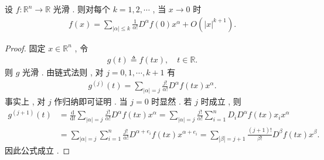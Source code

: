 \documentclass[../../main.tex]{subfiles}
\begin{document}
\begin{theorem}\label{theorem:ch01-taylor}
设 \(f:\mathbb{R}^n\to\mathbb{R}\) 光滑 . 则对每个 \(k=1,2,\cdots\) , 当 \(x\to 0\) 时
\begin{align*}
f(x)=\sum\limits_{|\alpha|\leqslant k}\frac{1}{\alpha!}D^\alpha f(0)x^\alpha+O(|x|^{k+1}).
\end{align*}
\end{theorem}
\begin{proof}
固定 \(x\in\mathbb{R}^n\) , 令
\begin{align*}
g(t)\triangleq f(tx),\quad t\in\mathbb{R}.
\end{align*}
则 \(g\) 光滑 . 由链式法则 , 对 \(j=0,1,\cdots,k+1\) 有
\begin{align*}
g^{(j)}(t)=\sum\limits_{|\alpha|=j}\frac{j!}{\alpha!}D^\alpha f(tx)x^\alpha.
\end{align*}
事实上 , 对 \(j\) 作归纳即可证明 . 当 \(j=0\) 时显然 . 若 \(j\) 时成立 , 则
\begin{align*}
g^{(j+1)}(t)
&=\frac{\mathrm{d}}{\mathrm{d}t}\sum\limits_{|\alpha|=j}\frac{j!}{\alpha!}D^\alpha f(tx)x^\alpha=\sum\limits_{|\alpha|=j}\frac{j!}{\alpha!}\sum\limits_{i=1}^nD_iD^\alpha f(tx)x_ix^\alpha\\
&=\sum\limits_{|\alpha|=j}\sum\limits_{i=1}^n\frac{j!}{\alpha!}D^{\alpha+e_i}f(tx)x^{\alpha+e_i}=\sum\limits_{|\beta|=j+1}\frac{(j+1)!}{\beta!}D^\beta f(tx)x^\beta.
\end{align*}
因此公式成立 .


\end{proof}
\end{document}
